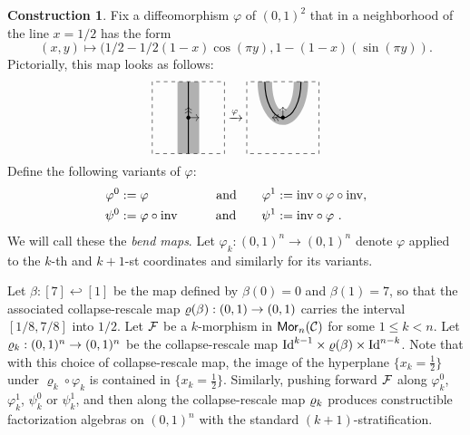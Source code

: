 \documentclass[10pt, reqno, twoside
, final
]{amsart}
\numberwithin{equation}{subsection}%
\theoremstyle{definition}
\theoremstyle{definition}
\theoremstyle{definition}
\theoremstyle{definition}
\newtheorem{cons}[defn]{Construction}
\theoremstyle{definition}
\theoremstyle{definition}
\theoremstyle{definition}
\theoremstyle{definition}
\theoremstyle{definition}
\theoremstyle{plain}
\theoremstyle{definition}
\theoremstyle{plain}
\theoremstyle{definition}
\theoremstyle{plain}
\theoremstyle{definition}
\theoremstyle{definition}
\theoremstyle{plain}
\theoremstyle{plain}
\theoremstyle{definition}
\theoremstyle{plain}
\theoremstyle{plain}
\theoremstyle{plain}
\begin{document}
\begin{cons}\label{cons:units}
Fix a diffeomorphism $\varphi$ of $(0,1)^2$ that in a neighborhood of the line $x=1/2$ has the form
\begin{equation}\label{eq:twist-formula}
    (x,y) \longmapsto (1/2 - 1/2(1 - x)\cos(\pi y), 1 - (1-x)(\sin(\pi y)).
\end{equation}
Pictorially, this map looks as follows:
\begin{equation*}
  \begin{tikzpicture}[baseline=0.9cm]
    \draw[dashed] (0,0) rectangle (2,2);
    \draw[thick] (1,0) -- (1,2);
    \fill[opacity=0.3] (0.7,0) rectangle (1.3,2);
    \filldraw (1,1) circle (1.4pt);
    \draw[->] (1,1) -- (1.3,1);
    \draw[->>] (1,1) -- (1,1.3);
\end{tikzpicture}
\xrightarrow{\varphi}
\begin{tikzpicture}[baseline=0.9cm]
    \draw[dashed] (0,0) rectangle (2,2);
    \draw[thick] (0.5,2) arc [start angle=180, end angle=360, x radius=0.5, y radius=1];
    \filldraw (1,1) circle (1.4pt);
    \fill[opacity=0.3] (0.3,2) arc [start angle=180, end angle=360, x radius=0.7, y radius=1.2] (1.7,2) -- (1.3,2) arc [start angle=0, end angle=-180, x radius=0.3, y radius=0.8] (0.7,2) -- (0.3,2);
    \draw[->] (1,1) -- (1,1.3);
     \draw[->>] (1,1) -- (0.7,1);
\end{tikzpicture}
\end{equation*}
Define the following variants of $\varphi$:
\begin{alignat*}{3}
    \varphi^0 &:=  \varphi \qquad &\text{and} \qquad \varphi^{1} &:= \mathrm{inv} \circ \varphi \circ \mathrm{inv} ,\\
    \psi^0 &:=  \varphi \circ \mathrm{inv} \qquad &\text{and} \qquad \psi^{1} &:=  \mathrm{inv} \circ \varphi \ .
    \end{alignat*}
We will call these the {\em bend maps}. Let $\varphi_k:(0,1)^n\to (0,1)^n$ denote $\varphi$ applied to the $k$-th and $k+1$-st coordinates and similarly for its variants.
\end{cons}
Let $\beta:[7]\hookleftarrow [1]$ be the map defined by $\beta(0)=0$ and $\beta(1)=7$, so that the associated collapse-rescale map $\varrho(\beta):(0,1)\rightarrow (0,1)$ carries the interval $[1/8,7/8]$ into $1/2$. Let $\mathcal{F}$ be a $k$-morphism in $\mathsf{Mor}_n(\mathcal{C})$ for some $1\leq k < n$. Let $\varrho_{k} : (0,1)^{n} \to (0,1)^{n}$ be the collapse-rescale map $\text{Id}^{k-1} \times \varrho(\beta)  \times \text{Id}^{n-k}$. Note that with this choice of collapse-rescale map, the image of the hyperplane $\{x_k=\frac12\}$ under $\varrho_k\circ \varphi_k$ is contained in $\{x_k=\frac12\}$. Similarly, pushing forward $\mathcal{F}$ along $\varphi_k^0$, $\varphi_k^1$, $\psi_k^0$ or $\psi_k^1$, and then along the collapse-rescale map $\varrho_{k}$ produces constructible factorization algebras on $(0,1)^n$ with the standard $(k+1)$-stratification.
\end{document}
